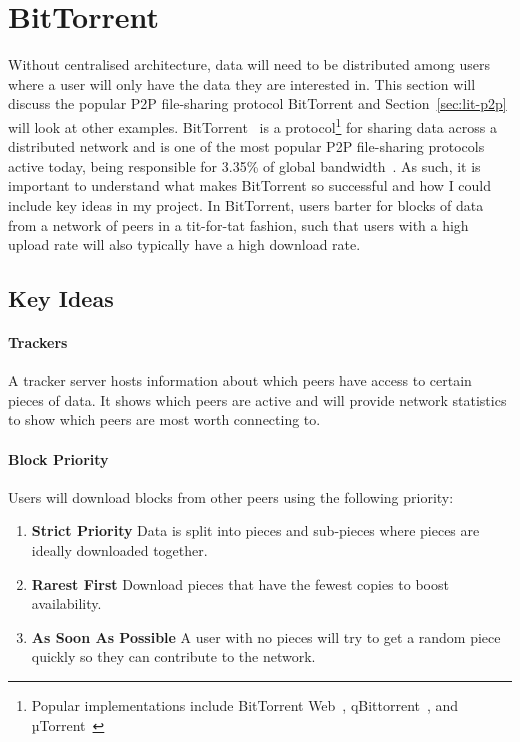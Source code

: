
\section{BitTorrent}\label{sec:bittorrent}

Without centralised architecture, data will need to be distributed among users where a user will only have the data they are interested in. This section will discuss the popular P2P file-sharing protocol BitTorrent and Section~\ref{sec:lit-p2p} will look at other examples.
\x
BitTorrent~\cite{kaune_unraveling_2010, pouwelse_bittorrent_2005} is a protocol\footnote{Popular implementations include BitTorrent Web~\cite{inc_bittorrent_nodate}, qBittorrent~\cite{noauthor_qbittorrent_nodate}, and µTorrent~\cite{inc_torrent_nodate}} for sharing data across a distributed network and is one of the most popular P2P file-sharing protocols active today, being responsible for 3.35\% of global bandwidth~\cite{noauthor_application_nodate}. 
As such, it is important to understand what makes BitTorrent so successful and how I could include key ideas in my project.
In BitTorrent, users barter for blocks of data from a network of peers in a tit-for-tat fashion, such that users with a high upload rate will also typically have a high download rate.

\subsection*{Key Ideas}

\paragraph*{Trackers}
A tracker server hosts information about which peers have access to certain pieces of data. It shows which peers are active and will provide network statistics to show which peers are most worth connecting to.

\paragraph*{Block Priority}
Users will download blocks from other peers using the following priority:
\begin{enumerate}
  \item \textbf{Strict Priority} Data is split into pieces and sub-pieces where pieces are ideally downloaded together.
  \item \textbf{Rarest First} Download pieces that have the fewest copies to boost availability.
  \item \textbf{As Soon As Possible} A user with no pieces will try to get a random piece quickly so they can contribute to the network. 
\end{enumerate}

